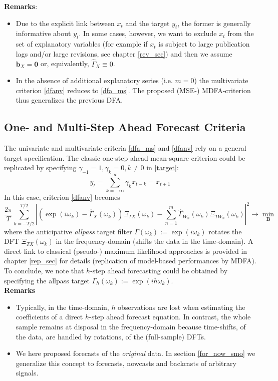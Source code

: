 \documentclass[a4paper]{book}
\begin{document}
\textbf{Remarks}:
\begin{itemize}
\item Due to the explicit link between $x_t$ and the target $y_t$, the former is generally informative about $y_t$. In some cases, however, we want to exclude $x_t$ from the set of explanatory variables (for example if $x_t$ is subject to large publication lags and/or large revisions, see chapter \ref{rev_sec}) and then we assume $\mathbf{b}_{X}=\mathbf{0}$ or, equivalently,  $\hat{\Gamma}_X\equiv 0$.
\item In the absence of additional explanatory series (i.e. $m=0$)  the multivariate criterion \ref{dfanv} reduces to \ref{dfa_ms}. The proposed (MSE-) MDFA-criterion thus generalizes the previous DFA. 
\end{itemize}






\subsection{One- and Multi-Step Ahead Forecast Criteria}\label{one_step}

The univariate and multivariate criteria \ref{dfa_ms} and \ref{dfanv} rely on a general target specification. The classic one-step ahead mean-square criterion could be replicated by specifying $\gamma_{-1}=1, \gamma_k=0, k\neq 0$ in \ref{target}:
\[y_t=\sum_{k=-\infty}^\infty\gamma_kx_{t-k}=x_{t+1}\]
In this case, criterion \ref{dfanv} becomes
\begin{equation}\label{dfanv_1s}
\frac{2\pi}{T} \sum_{k=-T/2}^{T/2}
\left|\left(\exp(i\omega_k)-\hat{\Gamma}_X(\omega_k)\right)\Xi_{T
X}(\omega_k)-\sum_{n=1}^m
\hat{\Gamma}_{W_n}(\omega_k)\Xi_{TW_n}(\omega_k)\right|^2 \to \min_{\mathbf{B}}
\end{equation}
where the anticipative \emph{allpass} target filter $\Gamma(\omega_k):=\exp(i\omega_k)$ rotates the DFT $\Xi_{T
X}(\omega_k)$ in the frequency-domain (shifts the data in the time-domain). A direct link to classical (pseudo-) maximum likelihood approaches is provided in chapter \ref{rep_sec} for details (replication of model-based performances by MDFA). To conclude, we note that  $h$-step ahead forecasting could be obtained by specifying the allpass target $\Gamma_h(\omega_k):=\exp(ih\omega_k)$. \\

\textbf{Remarks}
\begin{itemize}
\item Typically, in the time-domain, $h$ observations are lost when estimating the coefficients of a direct $h$-step ahead forecast equation. In contrast, the whole sample remains at disposal in the frequency-domain because time-shifts, of the data, are handled by rotations, of the (full-sample) DFTs.  
\item We here proposed forecasts of the \emph{original} data. In section \ref{for_now_smo} we generalize this concept to forecasts, nowcasts and backcasts of arbitrary signals.
\end{itemize}
\end{document}
